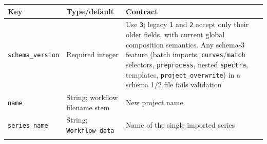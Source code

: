 \documentclass[
  10pt,
  a4paper,
  oneside]{scrreprt}
\begin{document}
\begin{longtable}[]{@{}lll@{}}
\toprule
\begin{minipage}[b]{0.30\columnwidth}\raggedright
Key\strut
\end{minipage} & \begin{minipage}[b]{0.30\columnwidth}\raggedright
Type/default\strut
\end{minipage} & \begin{minipage}[b]{0.30\columnwidth}\raggedright
Contract\strut
\end{minipage}\tabularnewline
\midrule
\endhead
\begin{minipage}[t]{0.30\columnwidth}\raggedright
\texttt{schema\_version}\strut
\end{minipage} & \begin{minipage}[t]{0.30\columnwidth}\raggedright
Required integer\strut
\end{minipage} & \begin{minipage}[t]{0.30\columnwidth}\raggedright
Use \texttt{3}; legacy \texttt{1} and \texttt{2} accept only their older
fields, with current global composition semantics. Any schema-3 feature
(batch imports, \texttt{curves}/\texttt{match} selectors,
\texttt{preprocess}, nested \texttt{spectra}, templates,
\texttt{project\_overwrite}) in a schema 1/2 file fails validation\strut
\end{minipage}\tabularnewline
\begin{minipage}[t]{0.30\columnwidth}\raggedright
\texttt{name}\strut
\end{minipage} & \begin{minipage}[t]{0.30\columnwidth}\raggedright
String; workflow filename stem\strut
\end{minipage} & \begin{minipage}[t]{0.30\columnwidth}\raggedright
New project name\strut
\end{minipage}\tabularnewline
\begin{minipage}[t]{0.30\columnwidth}\raggedright
\texttt{series\_name}\strut
\end{minipage} & \begin{minipage}[t]{0.30\columnwidth}\raggedright
String; \texttt{Workflow\ data}\strut
\end{minipage} & \begin{minipage}[t]{0.30\columnwidth}\raggedright
Name of the single imported series\strut
\end{minipage}\tabularnewline
\begin{minipage}[t]{0.30\columnwidth}\raggedright

\end{minipage}
\end{longtable}
\end{document}

